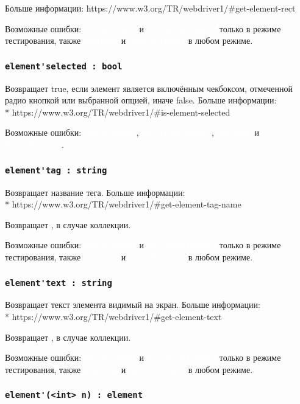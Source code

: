 \documentclass[a4paper, 14pt]{extarticle}
\newcommand{\ferror}[1]{{\fontsize{11pt}{12pt} \tt \colorbox{function}{\textcolor{white}{#1}}}}
\begin{document}
Больше информации: https://www.w3.org/TR/webdriver1/\#get-element-rect

Возможные ошибки: \ferror{EmptyElement} и \ferror{MultipleElements} только в режиме тестирования, также \ferror{NoWindow} и \ferror{NoSuchElement} в любом режиме.

\subsubsection{\lstinline|element'selected : bool|}

Возвращает true, если элемент является включённым чекбоксом, отмеченной радио кнопкой или выбранной опцией, иначе false. Больше информации: \\* https://www.w3.org/TR/webdriver1/\#is-element-selected

Возможные ошибки: \ferror{EmptyElement}, \ferror{MultipleElements}, \ferror{NoWindow} и \ferror{NoSuchElement}.

\subsubsection{\lstinline|element'tag : string|}

Возвращает название тега. Больше информации: \\* https://www.w3.org/TR/webdriver1/\#get-element-tag-name

\code{[icL]} Возвращает \listtype, в случае коллекции.

Возможные ошибки: \ferror{EmptyElement} и \ferror{MultipleElements} только в режиме тестирования, также \ferror{NoWindow} и \ferror{NoSuchElement} в любом режиме.

\subsubsection{\lstinline|element'text : string|}

Возвращает текст элемента видимый на экран. Больше информации: \\* https://www.w3.org/TR/webdriver1/\#get-element-text

\code{[icL]} Возвращает \listtype, в случае коллекции.

Возможные ошибки: \ferror{EmptyElement} и \ferror{MultipleElements} только в режиме тестирования, также \ferror{NoWindow} и \ferror{NoSuchElement} в любом режиме.

\subsubsection{\lstinline|element'(<int> n) : element|}
\end{document}
